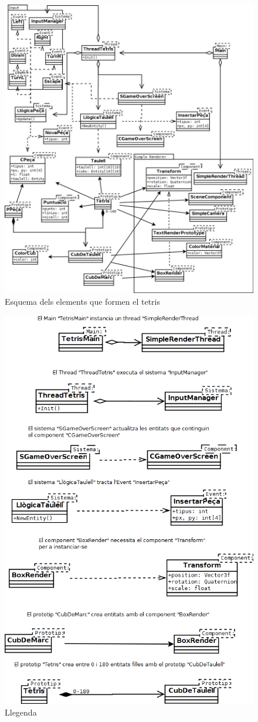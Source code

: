   \begin{figure}
    \includegraphics[width=1\linewidth]{./img/TetrisEntitats.png}
    \caption{Esquema dels elements que formen el tetris \label{fig:TetrisEntitats}}
  \end{figure}

  \begin{figure}
    \centering
    \includegraphics[width=0.7\linewidth]{./img/GuiaDiagramaQuadriga.png}
    \caption{Llegenda \label{fig:GuiaDiagramaQuadriga}}
  \end{figure}

